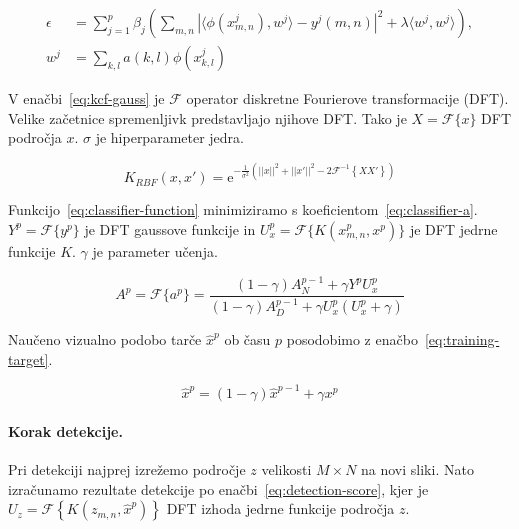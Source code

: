 \begin{equation}
\begin{aligned}
	\epsilon &= \sum_{j=1}^p \beta_j \left( 
	\sum_{m,n} \left| \langle \phi\left(x_{m,n}^j \right), w^j \rangle - y^j(m,n) \right|^2
    + \lambda \langle w^j, w^j \rangle
\right), \\
w^j &= \sum_{k,l} a(k,l) \phi\left(x_{k,l}^j  \right)
\end{aligned}
\label{eq:classifier-function}
\end{equation}

V enačbi~\eqref{eq:kcf-gauss} je $\mathcal{F}$ operator diskretne Fourierove transformacije (DFT). Velike začetnice spremenljivk predstavljajo njihove DFT. Tako je $X = \mathcal{F}\{ {x} \}$ DFT področja $x$. $\sigma$ je hiperparameter jedra.

\begin{equation}
K_{RBF}({x}, {x}') = \mathrm{e}^{-\frac{1}{\sigma^2}\left(
	||{x}||^2 + ||{x}'||^2 - 2 \mathcal{F}^{-1}\left\{ {X} {X}' \right\}
\right)}
\label{eq:kcf-gauss}
\end{equation}

Funkcijo~\eqref{eq:classifier-function} minimiziramo s koeficientom~\eqref{eq:classifier-a}.  $Y^p = \mathcal{F}\{y^p\}$ je DFT gaussove funkcije in $U_x^p = \mathcal{F}\{ K(x_{m,n}^p, x^p) \}$ je DFT jedrne funkcije $K$. $\gamma$ je parameter učenja.

\begin{equation}
A^p = \mathcal{F}\{a^p\} =  \frac{(1- \gamma) A_N^{p-1} + \gamma Y^p U_x^p}
{(1- \gamma)A_D^{p-1} + \gamma U_x^p\left( U_x^p + \gamma \right)}
\label{eq:classifier-a}
\end{equation}

Naučeno vizualno podobo tarče $\hat{x}^p$ ob času $p$ posodobimo z enačbo~\eqref{eq:training-target}.

\begin{equation}
\hat{x}^p = (1 - \gamma) \hat{x}^{p-1} + \gamma x^p
\label{eq:training-target}
\end{equation}


\paragraph{Korak detekcije.}
Pri detekciji najprej izrežemo področje $z$ velikosti $M \times N$ na novi sliki. Nato izračunamo rezultate detekcije po enačbi~\eqref{eq:detection-score}, kjer je $U_z = \mathcal{F}\left\{ K\left( z_{m,n}, \hat{x}^{p}  \right) \right\}$ DFT izhoda jedrne funkcije področja $z$.


